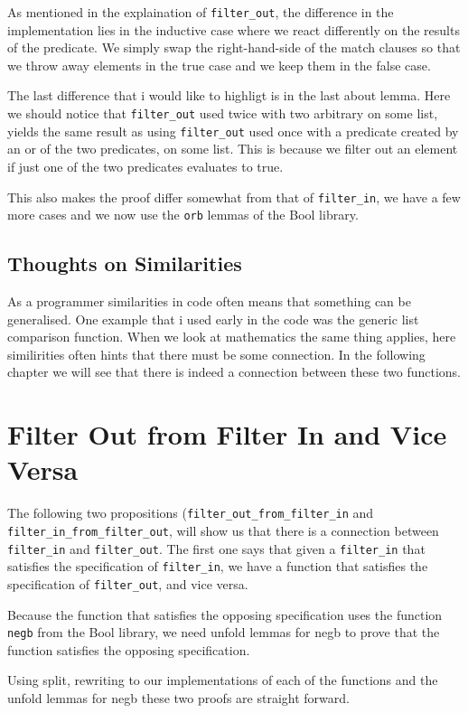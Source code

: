 \documentclass{article}
\begin{document}
As mentioned in the explaination of \texttt{filter\_out}, the difference in the implementation lies in the inductive case where we react differently on the results of the predicate. We simply swap the right-hand-side of the match clauses so that we throw away elements in the true case and we keep them in the false case.

The last difference that i would like to highligt is in the last about lemma. Here we should notice that \texttt{filter\_out} used twice with two arbitrary on some list, yields the same result as using \texttt{filter\_out} used once with a predicate created by an or of the two predicates, on some list. This is because we filter out an element if just one of the two predicates evaluates to true.

This also makes the proof differ somewhat from that of \texttt{filter\_in}, we have a few more cases and we now use the \texttt{orb} lemmas of the Bool library.

\subsection{Thoughts on Similarities}
As a programmer similarities in code often means that something can be generalised. One example that i used early in the code was the generic list comparison function. When we look at mathematics the same thing applies, here similirities often hints that there must be some connection. In the following chapter we will see that there is indeed a connection between these two functions.

\section{Filter Out from Filter In and Vice Versa}
The following two propositions (\texttt{filter\_out\_from\_filter\_in} and \texttt{filter\_in\_from\_filter\_out}, will show us that there is a connection between \texttt{filter\_in} and \texttt{filter\_out}. The first one says that given a \texttt{filter\_in} that satisfies the specification of \texttt{filter\_in}, we have a function that satisfies the specification of \texttt{filter\_out}, and vice versa.

Because the function that satisfies the opposing specification uses the function \texttt{negb} from the Bool library, we need unfold lemmas for negb to prove that the function satisfies the opposing specification.

Using split, rewriting to our implementations of each of the functions and the unfold lemmas for negb these two proofs are straight forward.
\end{document}
